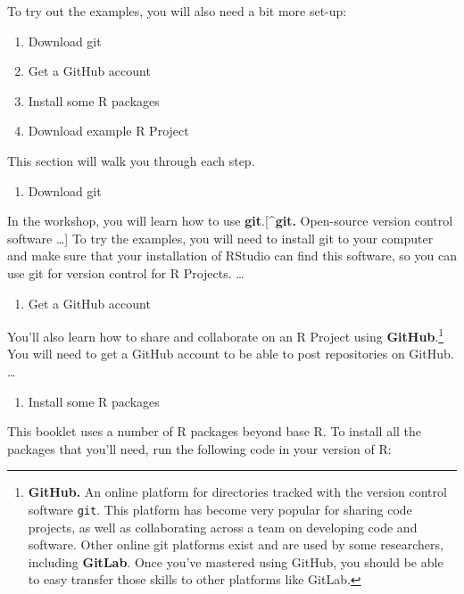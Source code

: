 \documentclass[]{tufte-book}
\providecommand{\tightlist}{%
  \setlength{\itemsep}{0pt}\setlength{\parskip}{0pt}}
\begin{document}
To try out the examples, you will also need a bit more set-up:

\begin{enumerate}
\def\labelenumi{\arabic{enumi}.}
\tightlist
\item
  Download git
\item
  Get a GitHub account
\item
  Install some R packages
\item
  Download example R Project
\end{enumerate}

This section will walk you through each step.

\begin{enumerate}
\def\labelenumi{\arabic{enumi}.}
\tightlist
\item
  Download git
\end{enumerate}

In the workshop, you will learn how to use \textbf{git}.{[}\^{}\textbf{git.} Open-source version control
software \ldots{}{]} To try the examples, you will need to install git to your computer and make
sure that your installation of RStudio can find this software, so you can use git for version
control for R Projects. \ldots{}

\begin{enumerate}
\def\labelenumi{\arabic{enumi}.}
\setcounter{enumi}{1}
\tightlist
\item
  Get a GitHub account
\end{enumerate}

You'll also learn how to share and collaborate on an R Project using \textbf{GitHub}.\footnote{\textbf{GitHub.}
  An online platform for directories tracked with
  the version control software \texttt{git}. This platform has become
  very popular for sharing code projects, as well as collaborating across a team on developing
  code and software. Other online git platforms exist and are used by some researchers,
  including \textbf{GitLab}. Once you've mastered using GitHub, you should be able to easy
  transfer those skills to other platforms like GitLab.} You will need to get a GitHub
account to be able to post repositories on GitHub. \ldots{}

\begin{enumerate}
\def\labelenumi{\arabic{enumi}.}
\setcounter{enumi}{2}
\tightlist
\item
  Install some R packages
\end{enumerate}

This booklet uses a number of R packages beyond base R. To install all the packages that you'll
need, run the following code in your version of R:
\end{document}
